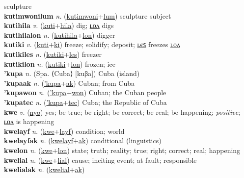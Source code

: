 sculpture \label{kutimwonilon} \\
\textbf{kutimwonilum} \textit{n.} (\hyperref[kutimwoni]{kutimwoni}+\hyperref[lum]{lum})
sculpture subject \label{kutimwonilum} \\
\textbf{kutihila} \textit{v.} (\hyperref[kuti]{kuti}+\hyperref[hila]{hila})
dig; \hyperref[kutihilalon]{ʟᴏᴧ} digs \label{kutihila} \\
\textbf{kutihilalon} \textit{n.} (\hyperref[kutihila]{kutihila}+\hyperref[lon]{lon})
digger \label{kutihilalon} \\
\textbf{kutiki} \textit{v.} (\hyperref[kuti]{kuti}+\hyperref[ki]{ki})
freeze; solidify; deposit; \hyperref[kutikiles]{ʟєꜱ} freezes \hyperref[kutikilon]{ʟᴏᴧ} \label{kutiki} \\
\textbf{kutikiles} \textit{n.} (\hyperref[kutiki]{kutiki}+\hyperref[les]{les})
freezer \label{kutikiles} \\
\textbf{kutikilon} \textit{n.} (\hyperref[kutiki]{kutiki}+\hyperref[lon]{lon})
frozen; ice \label{kutikilon} \\
\textbf{'kupa} \textit{n.} (Spa. ⟨Cuba⟩ [kuβa])
Cuba (island) \label{'kupa} \\
\textbf{'kupaak} \textit{n.} (\hyperref['kupa]{'kupa}+\hyperref[ak]{ak})
Cuban; from Cuba \label{'kupaak} \\
\textbf{'kupawon} \textit{n.} (\hyperref['kupa]{'kupa}+\hyperref[won]{won})
Cuban; the Cuban people \label{'kupawon} \\
\textbf{'kupatec} \textit{n.} (\hyperref['kupa]{'kupa}+\hyperref[tec]{tec})
Cuba; the Republic of Cuba \label{'kupatec} \\
\textbf{kwe} \textit{v.} (\hyperref[nyo]{\sout{nyo}})
yes; be true; be right; be correct; be real; be happening; \textit{positive}; \hyperref[kwelon]{ʟᴏᴧ} is happening \label{kwe} \\
\textbf{kwelayf} \textit{n.} (\hyperref[kwe]{kwe}+\hyperref[layf]{layf})
condition; world \label{kwelayf} \\
\textbf{kwelayfak} \textit{n.} (\hyperref[kwelayf]{kwelayf}+\hyperref[ak]{ak})
conditional (linguistics) \label{kwelayfak} \\
\textbf{kwelon} \textit{n.} (\hyperref[kwe]{kwe}+\hyperref[lon]{lon})
state; truth; reality; true; right; correct; real; happening \label{kwelon} \\
\textbf{kwelial} \textit{n.} (\hyperref[kwe]{kwe}+\hyperref[lial]{lial})
cause; inciting event; at fault; responsible \label{kwelial} \\
\textbf{kwelialak} \textit{n.} (\hyperref[kwelial]{kwelial}+\hyperref[ak]{ak})
